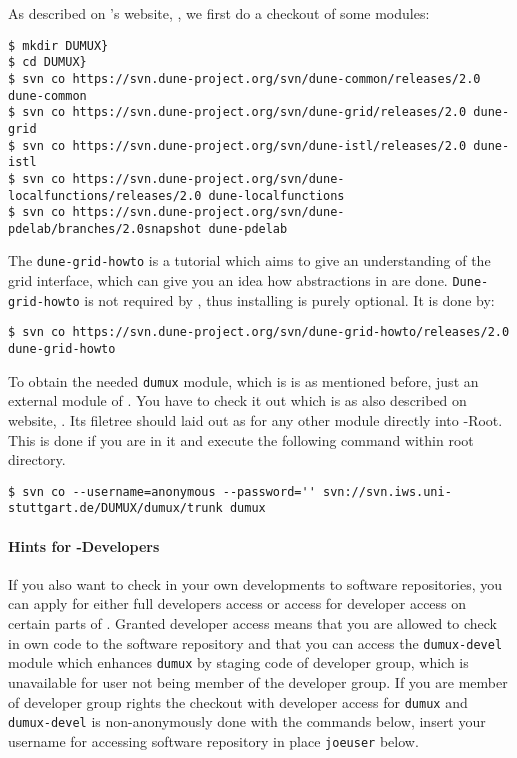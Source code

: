 As described on \Dune's website, \cite{DUNE-DOWNLOAD-SVN}, we first do a checkout of some \Dune modules:

\begin{lstlisting}[style=Bash]
$ mkdir DUMUX}
$ cd DUMUX}
$ svn co https://svn.dune-project.org/svn/dune-common/releases/2.0 dune-common
$ svn co https://svn.dune-project.org/svn/dune-grid/releases/2.0 dune-grid
$ svn co https://svn.dune-project.org/svn/dune-istl/releases/2.0 dune-istl
$ svn co https://svn.dune-project.org/svn/dune-localfunctions/releases/2.0 dune-localfunctions
$ svn co https://svn.dune-project.org/svn/dune-pdelab/branches/2.0snapshot dune-pdelab
\end{lstlisting}

The \texttt{dune-grid-howto} is a tutorial which aims to give an understanding of the \Dune grid interface, which can 
give you an idea how abstractions in \Dune are done. \texttt{Dune-grid-howto} is not required by \Dumux, thus installing is purely optional. It is done by: 

\begin{lstlisting}[style=Bash]
$ svn co https://svn.dune-project.org/svn/dune-grid-howto/releases/2.0 dune-grid-howto
\end{lstlisting}

To obtain the needed \texttt{dumux} module, which is is as mentioned before, just an external module of \Dune. You have to check it out which is as also described on \Dumux website, \cite{DUMUX-HP}.
Its filetree should laid out as for any other \Dune module directly into \Dune-Root. This is done if you are in it and execute the following command within \Dune root directory.

\begin{lstlisting}[style=Bash]
$ svn co --username=anonymous --password='' svn://svn.iws.uni-stuttgart.de/DUMUX/dumux/trunk dumux
\end{lstlisting}

\paragraph{Hints for \Dumux-Developers}
If you also want to check in your own \Dumux developments to \Dumux software repositories, you can apply for either full developers access or access for developer access on certain parts of \Dumux. Granted developer access means that you are allowed to check in own code to the software repository and that you can access the \texttt{dumux-devel} module which enhances \texttt{dumux} by staging code of developer group, which is unavailable for user not being member of the developer group.
If you are member of developer group rights the checkout with developer access for \texttt{dumux} and \texttt{dumux-devel} is non-anonymously done with the commands below, insert your username
for accessing \Dumux software repository in place \texttt{joeuser} below.

